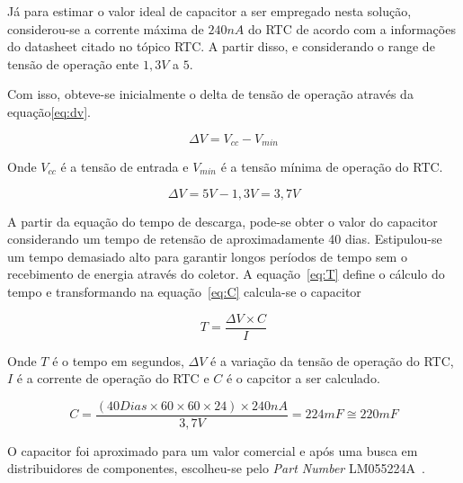 Já para estimar o valor ideal de capacitor a ser empregado nesta solução, considerou-se a corrente máxima de $240nA$ do RTC de acordo com a informações do datasheet citado no tópico RTC. A partir disso, e considerando o range de tensão de operação ente $1,3V$ a $5$.

Com isso, obteve-se inicialmente o delta de tensão de operação através da equação\ref{eq:dv}.



\begin{equation}
    \Delta V = V_{cc}-V_{min}
  \label{eq:dv}
\end{equation}


Onde $V_{cc}$ é a tensão de entrada e $V_{min}$ é a tensão mínima de operação do RTC.

\begin{equation}
     \Delta V =5V-1,3V = 3,7V
\end{equation}

A partir da equação do tempo de descarga, pode-se obter o valor do capacitor considerando um tempo de retensão de aproximadamente 40 dias. Estipulou-se um tempo demasiado alto para garantir longos períodos de tempo sem o recebimento de energia através do coletor. A equação~\ref{eq:T} define o cálculo do tempo e transformando na equação~\ref{eq:C} calcula-se o capacitor


\begin{equation}
    T=\frac{\Delta V \times C}{I}
  \label{eq:T}
\end{equation}

Onde $T$ é o tempo em segundos, $\Delta V$ é a variação da tensão de operação do RTC, $I$ é a corrente de operação do RTC e $C$ é o capcitor a ser calculado.

\begin{equation}
    C=\frac{(40 Dias\times 60\times60\times24) \times 240nA}{3,7V} = 224mF \cong 220mF
      \label{eq:C}
\end{equation}

O capacitor foi aproximado para um valor comercial e após uma busca em distribuidores de componentes, escolheu-se pelo \textit{Part Number} LM055224A~\cite{Ohmite}.


